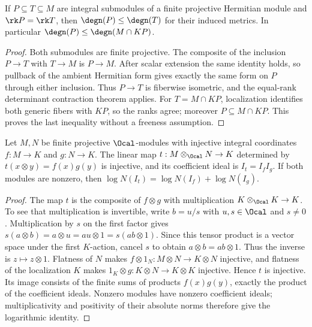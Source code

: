 \begin{lemma}
\label{lem:saturation-degree}
\leanok
If $P\subseteq T\subseteq M$ are integral submodules of a finite projective
Hermitian module and $\rk P=\rk T$, then $\degn(P)\leq\degn(T)$
for their induced metrics. In particular
$\degn(P)\leq\degn(M\cap KP)$.
\end{lemma}
\begin{proof}
Both submodules are finite projective. The composite of the inclusion
$P\to T$ with $T\to M$ is $P\to M$. After scalar extension the same
identity holds, so pullback of the ambient Hermitian form gives exactly
the same form on $P$ through either inclusion. Thus $P\to T$ is
fiberwise isometric, and the equal-rank determinant contraction theorem
applies. For $T=M\cap KP$, localization identifies both generic fibers
with $KP$, so the ranks agree; moreover $P\subseteq M\cap KP$.
This proves the last inequality without a freeness assumption.
\end{proof}

\begin{lemma}
\label{lem:tensor-coordinate-ideal}
\leanok
Let $M,N$ be finite projective $\Ocal$-modules with injective integral
coordinates $f:M\to K$ and $g:N\to K$. The linear map
$t:M\otimes_\Ocal N\to K$ determined by $t(x\otimes y)=f(x)g(y)$
is injective, and its coefficient ideal is $I_t=I_fI_g$.
If both modules are nonzero, then
$\log N(I_t)=\log N(I_f)+\log N(I_g)$.
\end{lemma}
\begin{proof}
The map $t$ is the composite of $f\otimes g$ with multiplication
$K\otimes_\Ocal K\to K$. To see that multiplication is invertible,
write $b=u/s$ with $u,s\in\Ocal$ and $s\ne0$.
Multiplication by $s$ on the first factor gives
$s(a\otimes b)=a\otimes u=au\otimes1=s(ab\otimes1)$.
Since this tensor product is a vector space under the first $K$-action,
cancel $s$ to obtain $a\otimes b=ab\otimes1$. Thus the inverse is
$z\mapsto z\otimes1$. Flatness of $N$ makes
$f\otimes1_N:M\otimes N\to K\otimes N$ injective, and flatness of
the localization $K$ makes $1_K\otimes g:K\otimes N\to K\otimes K$
injective. Hence $t$ is injective.
Its image consists of the finite sums of products $f(x)g(y)$, exactly
the product of the coefficient ideals. Nonzero modules have nonzero
coefficient ideals; multiplicativity and positivity of their absolute
norms therefore give the logarithmic identity.
\end{proof}

